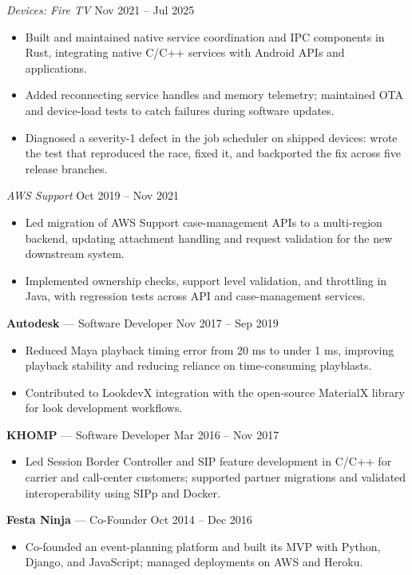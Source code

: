 \documentclass[line,margin]{res}
\begin{document}
\begin{resume}
{\sl Devices: Fire TV} \hfill Nov 2021 -- Jul 2025
\begin{itemize} \itemsep -3pt
\item Built and maintained native service coordination and IPC components in Rust, integrating native C/C++ services with Android APIs and applications.
\item Added reconnecting service handles and memory telemetry; maintained OTA and device-load tests to catch failures during software updates.
\item Diagnosed a severity-1 defect in the job scheduler on shipped devices: wrote the test that reproduced the race, fixed it, and backported the fix across five release branches.
\end{itemize}

{\sl AWS Support} \hfill Oct 2019 -- Nov 2021
\begin{itemize} \itemsep -3pt
\item Led migration of AWS Support case-management APIs to a multi-region backend, updating attachment handling and request validation for the new downstream system.
\item Implemented ownership checks, support level validation, and throttling in Java, with regression tests across API and case-management services.
\end{itemize}

\textbf{Autodesk} --- Software Developer \hfill Nov 2017 -- Sep 2019
\begin{itemize} \itemsep -3pt
\item Reduced Maya playback timing error from 20 ms to under 1 ms, improving playback stability and reducing reliance on time-consuming playblasts.
\item Contributed to LookdevX integration with the open-source MaterialX library for look development workflows.
\end{itemize}

\textbf{KHOMP} --- Software Developer \hfill Mar 2016 -- Nov 2017
\begin{itemize} \itemsep -3pt
\item Led Session Border Controller and SIP feature development in C/C++ for carrier and call-center customers; supported partner migrations and validated interoperability using SIPp and Docker.
\end{itemize}

\textbf{Festa Ninja} --- Co-Founder \hfill Oct 2014 -- Dec 2016
\begin{itemize} \itemsep -3pt
\item Co-founded an event-planning platform and built its MVP with Python, Django, and JavaScript; managed deployments on AWS and Heroku.
\end{itemize}


\end{resume}
\end{document}
